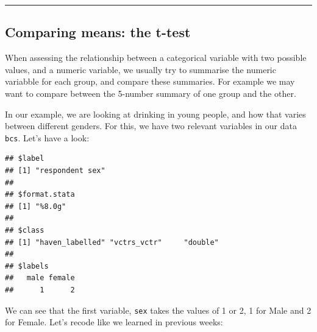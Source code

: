 \documentclass[
]{book}
\newenvironment{Shaded}{\begin{snugshade}}{\end{snugshade}}
\newcommand{\FunctionTok}[1]{\textcolor[rgb]{0.00,0.00,0.00}{#1}}
\newcommand{\NormalTok}[1]{#1}
\newcommand{\OtherTok}[1]{\textcolor[rgb]{0.56,0.35,0.01}{#1}}
\newcommand{\SpecialCharTok}[1]{\textcolor[rgb]{0.00,0.00,0.00}{#1}}
\begin{document}
\begin{center}\rule{0.5\linewidth}{0.5pt}\end{center}

\hypertarget{comparing-means-the-t-test}{%
\subsection{Comparing means: the t-test}\label{comparing-means-the-t-test}}

When assessing the relationship between a categorical variable with two possible values, and a numeric variable, we usually try to summarise the numeric variabble for each group, and compare these summaries. For example we may want to compare between the 5-number summary of one group and the other.

In our example, we are looking at drinking in young people, and how that varies between different genders. For this, we have two relevant variables in our data \texttt{bcs}. Let's have a look:

\begin{Shaded}
\end{Shaded}

\begin{verbatim}
## $label
## [1] "respondent sex"
## 
## $format.stata
## [1] "%8.0g"
## 
## $class
## [1] "haven_labelled" "vctrs_vctr"     "double"        
## 
## $labels
##   male female 
##      1      2
\end{verbatim}

We can see that the first variable, \texttt{sex} takes the values of 1 or 2, 1 for Male and 2 for Female. Let's recode like we learned in previous weeks:

\begin{Shaded}
\end{Shaded}

\begin{Shaded}
\end{Shaded}
\end{document}
